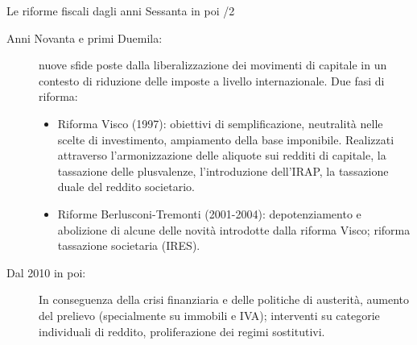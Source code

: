 \documentclass[aspectratio=64,12pt]{beamer}
\begin{document}
\begin{frame}{Le riforme fiscali dagli anni Sessanta in poi /2}
  \begin{description}
    
  \item[Anni Novanta e primi Duemila:] nuove sfide poste dalla liberalizzazione dei movimenti di capitale in un contesto di riduzione delle imposte a livello internazionale. Due fasi di riforma:
    \begin{itemize}
    \item Riforma Visco (1997): obiettivi di semplificazione, neutralità nelle
      scelte di investimento, ampiamento della base imponibile. Realizzati
      attraverso l'armonizzazione delle aliquote sui redditi di capitale, la
      tassazione delle plusvalenze, l'introduzione dell'IRAP, la tassazione
      duale del reddito societario.
    \item Riforme Berlusconi-Tremonti (2001-2004): depotenziamento e abolizione di alcune delle novità introdotte dalla riforma Visco; riforma tassazione societaria (IRES). 
    \end{itemize}
  \item[Dal 2010 in poi:] In conseguenza della crisi finanziaria e delle politiche di austerità, aumento del prelievo (specialmente su immobili e IVA); interventi su categorie individuali di reddito, proliferazione dei regimi sostitutivi.
    
  \end{description}

\end{frame}
\end{document}
